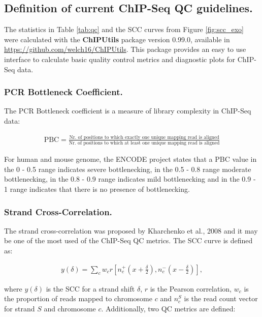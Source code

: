 \documentclass{bmcart}\usepackage[]{graphicx}\usepackage[]{color}
\begin{document}
\subsection*{Definition of current ChIP-Seq QC guidelines.}

The statistics in Table \ref{tab:qc} and the SCC curves from Figure
\ref{fig:scc_exo} were calculated with the \textbf{ChIPUtils} package
version 0.99.0, available in
\url{https://github.com/welch16/ChIPUtils}. This package provides an
easy to use interface to calculate basic quality control metrics and
diagnostic plots for ChIP-Seq data.

\subsubsection*{PCR Bottleneck Coefficient.}

The PCR Bottleneck coefficient is a measure of library complexity in
ChIP-Seq data:

\begin{align}
  \mbox{PBC} = \frac{\text{Nr. of positions to which exactly one
      unique mapping read is aligned}}{\text{Nr. of positions to
      which at least one unique mapping read is aligned}} \nonumber
\end{align}

For human and mouse genome, the ENCODE project states that a PBC value
in the 0 - 0.5 range indicates severe bottlenecking, in the 0.5 - 0.8
range moderate bottlenecking, in the 0.8 - 0.9 range indicates mild
bottlenecking and in the 0.9 - 1 range indicates that there is no
presence of bottlenecking.

\subsubsection*{Strand Cross-Correlation.}

The strand cross-correlation was proposed by Kharchenko et al., 2008
\cite{strandcc} and it may be one of the most used of the ChIP-Seq QC
metrics. The SCC curve is defined as:

\begin{align}
  y(\delta) = \sum_c w_c r\left[ n_c^+ \left(x + \frac{\delta}{2}
    \right), n_c^- \left( x- \frac{\delta}{2} \right)\right],
\label{scc}
\end{align}

where $y(\delta)$ is the SCC for a strand shift $\delta$, $r$ is the
Pearson correlation, $w_c$ is the proportion of reads mapped to
chromosome $c$ and $n_c^S$ is the read count vector for strand $S$ and
chromosome $c$. Additionally, two QC metrics are defined:
\end{document}
